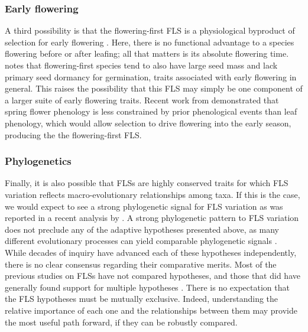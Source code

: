 \documentclass[12pt]{article}
\begin{document}
\subsubsection*{Early flowering}
\noindent A third possibility is that the flowering-first FLS is a physiological byproduct of selection for early flowering \citep{Primack1987}. Here, there is no functional advantage to a species flowering before or after leafing; all that matters is its absolute flowering time. \citet{Primack1987} notes that flowering-first species tend to also have large seed mass and lack primary seed dormancy for germination, traits associated with early flowering in general. This raises the possibility that this FLS may simply be one component of a larger suite of early flowering traits. Recent work from \citet{Savage2019} demonstrated that spring flower phenology is less constrained by prior phenological events than leaf phenology, which would allow selection to drive flowering into the early season, producing the the flowering-first FLS. %

\subsubsection*{Phylogenetics} 
\noindent Finally, it is also possible that FLSs are highly conserved traits for which FLS variation reflects macro-evolutionary relationships among taxa. If this is the case, we would expect to see a strong phylogenetic signal for FLS variation as was reported in a recent analysis by \citet{Gougherty2018}. A strong phylogenetic pattern to FLS variation does not preclude any of the adaptive hypotheses presented above, as  many different evolutionary processes can yield comparable phylogenetic signals \citep{Revell2008}. \\

\noindent While decades of inquiry have advanced each of these hypotheses independently, there is no clear consensus regarding their comparative merits. Most of the previous studies on FLSs have not compared hypotheses, and those that did have generally found support for multiple hypotheses \citep[see][]{Bolmgren2003,Gougherty2018}. There is no expectation that the FLS hypotheses must be mutually exclusive. Indeed, understanding the relative importance of each one and the relationships between them may provide the most useful path forward, if they can be robustly compared.\\
\end{document}
